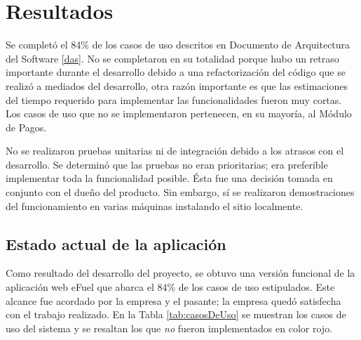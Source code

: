 \chapter{Resultados} \label{results}
Se completó el 84\% de los casos de uso descritos en Documento de Arquitectura del Software \ref{das}. No se completaron en su totalidad porque hubo un retraso importante durante el desarrollo debido a una refactorización del código que se realizó a mediados del desarrollo, otra razón importante es que las estimaciones del tiempo requerido para implementar las funcionalidades fueron muy cortas. Los casos de uso que no se implementaron pertenecen, en su mayoría, al Módulo de Pagos.

No se realizaron pruebas unitarias ni de integración debido a los atrasos con el desarrollo. Se determinó que las pruebas no eran prioritarias; era preferible implementar toda la funcionalidad posible. Ésta fue una decisión tomada en conjunto con el dueño del producto. Sin embargo, sí se realizaron demostraciones del funcionamiento en varias máquinas instalando el sitio localmente.

\section{Estado actual de la aplicación}
Como resultado del desarrollo del proyecto, se obtuvo una versión funcional de la aplicación web eFuel que abarca el 84\% de los casos de uso estipulados. Este alcance fue acordado por la empresa y el pasante; la empresa quedó satisfecha con el trabajo realizado. En la Tabla \ref{tab:casosDeUso} se muestran los casos de uso del sistema y se resaltan los que \emph{no} fueron implementados en color rojo.

\newcommand\usecasenumber{\stepcounter{usecasesrownumbers}\arabic{usecasesrownumbers}}

